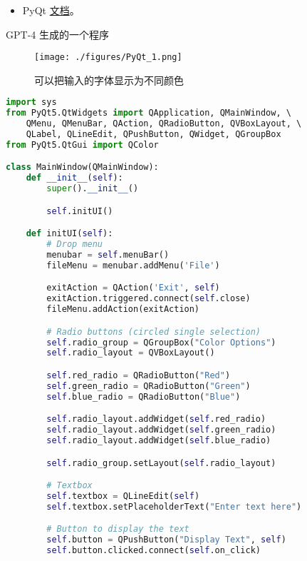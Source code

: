 
\begin{issues}
\issueDraft
\end{issues}

\begin{itemize}
\item PyQt \href{https://www.riverbankcomputing.com/static/Docs/PyQt5/}{文档}。
\end{itemize}


GPT-4 生成的一个程序
\begin{figure}[ht]
\centering
\texttt{[image: ./figures/PyQt\_1.png]}
\caption{可以把输入的字体显示为不同颜色} \label{PyQt_fig1}
\end{figure}


\begin{lstlisting}[language=python]
import sys
from PyQt5.QtWidgets import QApplication, QMainWindow, \ 
    QMenu, QMenuBar, QAction, QRadioButton, QVBoxLayout, \ 
    QLabel, QLineEdit, QPushButton, QWidget, QGroupBox
from PyQt5.QtGui import QColor

class MainWindow(QMainWindow):
    def __init__(self):
        super().__init__()

        self.initUI()

    def initUI(self):
        # Drop menu
        menubar = self.menuBar()
        fileMenu = menubar.addMenu('File')

        exitAction = QAction('Exit', self)
        exitAction.triggered.connect(self.close)
        fileMenu.addAction(exitAction)

        # Radio buttons (circled single selection)
        self.radio_group = QGroupBox("Color Options")
        self.radio_layout = QVBoxLayout()

        self.red_radio = QRadioButton("Red")
        self.green_radio = QRadioButton("Green")
        self.blue_radio = QRadioButton("Blue")

        self.radio_layout.addWidget(self.red_radio)
        self.radio_layout.addWidget(self.green_radio)
        self.radio_layout.addWidget(self.blue_radio)

        self.radio_group.setLayout(self.radio_layout)

        # Textbox
        self.textbox = QLineEdit(self)
        self.textbox.setPlaceholderText("Enter text here")

        # Button to display the text
        self.button = QPushButton("Display Text", self)
        self.button.clicked.connect(self.on_click)


\end{lstlisting}
